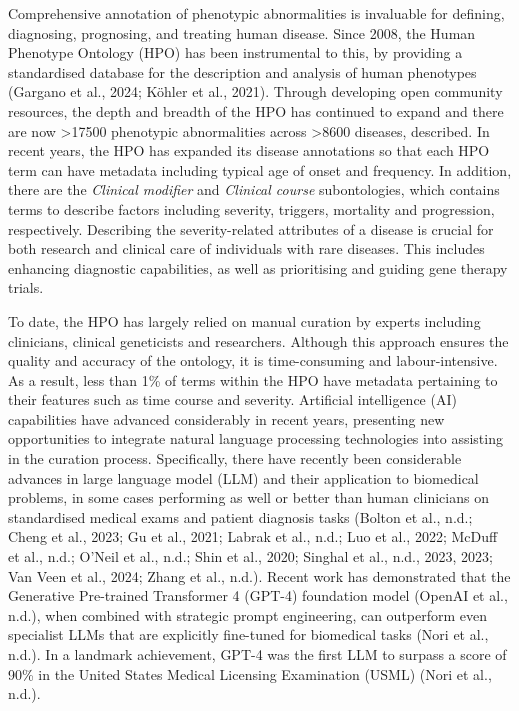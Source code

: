 \documentclass[
]{agujournal2019}
\begin{document}
Comprehensive annotation of phenotypic abnormalities is invaluable for
defining, diagnosing, prognosing, and treating human disease. Since
2008, the Human Phenotype Ontology (HPO) has been instrumental to this,
by providing a standardised database for the description and analysis of
human phenotypes (Gargano et al., 2024; Köhler et al., 2021). Through
developing open community resources, the depth and breadth of the HPO
has continued to expand and there are now \textgreater17500 phenotypic
abnormalities across \textgreater8600 diseases, described. In recent
years, the HPO has expanded its disease annotations so that each HPO
term can have metadata including typical age of onset and frequency. In
addition, there are the \emph{Clinical modifier} and \emph{Clinical
course} subontologies, which contains terms to describe factors
including severity, triggers, mortality and progression, respectively.
Describing the severity-related attributes of a disease is crucial for
both research and clinical care of individuals with rare diseases. This
includes enhancing diagnostic capabilities, as well as prioritising and
guiding gene therapy trials.

To date, the HPO has largely relied on manual curation by experts
including clinicians, clinical geneticists and researchers. Although
this approach ensures the quality and accuracy of the ontology, it is
time-consuming and labour-intensive. As a result, less than 1\% of terms
within the HPO have metadata pertaining to their features such as time
course and severity. Artificial intelligence (AI) capabilities have
advanced considerably in recent years, presenting new opportunities to
integrate natural language processing technologies into assisting in the
curation process. Specifically, there have recently been considerable
advances in large language model (LLM) and their application to
biomedical problems, in some cases performing as well or better than
human clinicians on standardised medical exams and patient diagnosis
tasks (Bolton et al., n.d.; Cheng et al., 2023; Gu et al., 2021; Labrak
et al., n.d.; Luo et al., 2022; McDuff et al., n.d.; O'Neil et al.,
n.d.; Shin et al., 2020; Singhal et al., n.d., 2023, 2023; Van Veen et
al., 2024; Zhang et al., n.d.). Recent work has demonstrated that the
Generative Pre-trained Transformer 4 (GPT-4) foundation model (OpenAI et
al., n.d.), when combined with strategic prompt engineering, can
outperform even specialist LLMs that are explicitly fine-tuned for
biomedical tasks (Nori et al., n.d.). In a landmark achievement, GPT-4
was the first LLM to surpass a score of 90\% in the United States
Medical Licensing Examination (USML) (Nori et al., n.d.).
\end{document}
